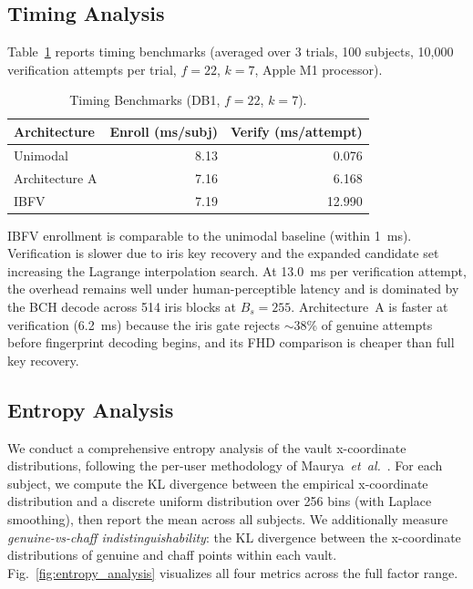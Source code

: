 \documentclass[conference]{IEEEtran}
\newcommand{\IBFV}{\textsf{IBFV}}
\begin{document}
\subsection{Timing Analysis}
\label{sec:timing_results}

Table~\ref{tab:timing} reports timing benchmarks (averaged over 3 trials, 100 subjects, 10{,}000 verification attempts per trial, $f = 22$, $k = 7$, Apple M1 processor).

\begin{table}[t]
\centering
\caption{Timing Benchmarks (DB1, $f = 22$, $k = 7$).}
\label{tab:timing}
\begin{tabular}{@{}l r r@{}}
\toprule
\textbf{Architecture} & \textbf{Enroll (ms/subj)} & \textbf{Verify (ms/attempt)} \\
\midrule
Unimodal & 8.13 & 0.076 \\
Architecture A & 7.16 & 6.168 \\
\IBFV{} & 7.19 & 12.990 \\
\bottomrule
\end{tabular}
\end{table}

\IBFV{} enrollment is comparable to the unimodal baseline (within 1~ms). Verification is slower due to iris key recovery and the expanded candidate set increasing the Lagrange interpolation search. At 13.0~ms per verification attempt, the overhead remains well under human-perceptible latency and is dominated by the BCH decode across 514 iris blocks at $B_s = 255$. Architecture~A is faster at verification (6.2~ms) because the iris gate rejects $\sim$38\% of genuine attempts before fingerprint decoding begins, and its FHD comparison is cheaper than full key recovery.

\subsection{Entropy Analysis}
\label{sec:entropy_results}

We conduct a comprehensive entropy analysis of the vault x-coordinate distributions, following the per-user methodology of Maurya~\textit{et~al.}~\cite{maurya2025enhancing}. For each subject, we compute the KL divergence between the empirical x-coordinate distribution and a discrete uniform distribution over 256 bins (with Laplace smoothing), then report the mean across all subjects. We additionally measure \emph{genuine-vs-chaff indistinguishability}: the KL divergence between the x-coordinate distributions of genuine and chaff points within each vault. Fig.~\ref{fig:entropy_analysis} visualizes all four metrics across the full factor range.
\end{document}
